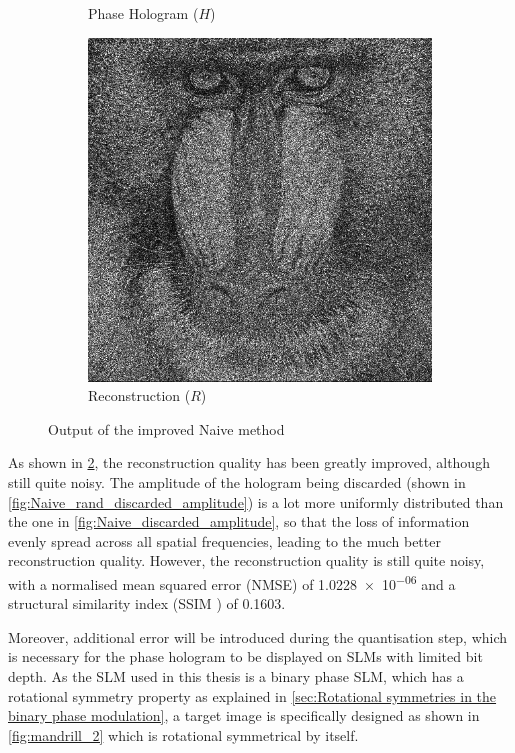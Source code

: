 \begin{figure}[H]
\begin{subfigure}[t]{0.3\textwidth}
    \caption{Phase Hologram ($H$)}
    \label{fig:Naive_rand_holo}
  \end{subfigure}
  \hfill
  \begin{subfigure}[t]{0.3\textwidth}
    \centering
    \includegraphics[width=\textwidth]{Naive_rand_recon.png}
    \caption{Reconstruction ($R$)}
    \label{fig:Naive_rand_recon}
  \end{subfigure}
  \caption{Output of the improved Naive method}
  \label{fig:Output of the improved Naive method}
\end{figure}

As shown in \cref{fig:Naive_rand_recon}, the reconstruction quality has been greatly improved, although still quite noisy. The amplitude of the hologram being discarded (shown in \cref{fig:Naive_rand_discarded_amplitude}) is a lot more uniformly distributed than the one in \cref{fig:Naive_discarded_amplitude}, so that the loss of information evenly spread across all spatial frequencies, leading to the much better reconstruction quality. However, the reconstruction quality is still quite noisy, with a normalised mean squared error (NMSE) of \num{1.0228e-06} and a structural similarity index (SSIM \cite{Wang2004_SSIM}) of 0.1603.

Moreover, additional error will be introduced during the quantisation step, which is necessary for the phase hologram to be displayed on SLMs with limited bit depth. As the SLM used in this thesis is a binary phase SLM, which has a rotational symmetry property as explained in \cref{sec:Rotational symmetries in the binary phase modulation}, a target image is specifically designed as shown in \cref{fig:mandrill_2} which is rotational symmetrical by itself.

